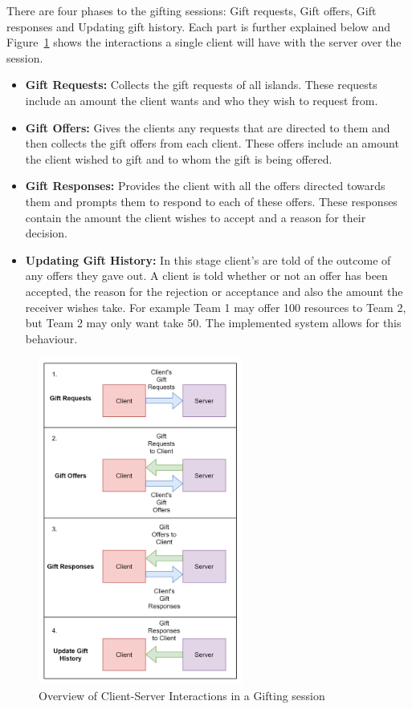 There are four phases to the gifting sessions: Gift requests, Gift offers, Gift responses and Updating gift history. Each part is further explained below and Figure~\ref{fig:IITO:gifting_session_diagram} shows the interactions a single client will have with the server over the session.
\begin{itemize}
    \item \textbf{Gift Requests:} Collects the gift requests of all islands. These requests include an amount the client wants and who they wish to request from.
    \item \textbf{Gift Offers:} Gives the clients any requests that are directed to them and then collects the gift offers from each client. These offers include an amount the client wished to gift and to whom the gift is being offered.
    \item \textbf{Gift Responses:} Provides the client with all the offers directed towards them and prompts them to respond to each of these offers. These responses contain the amount the client wishes to accept and a reason for their decision.
    \item \textbf{Updating Gift History:} In this stage client's are told of the outcome of any offers they gave out. A client is told whether or not an offer has been accepted, the reason for the rejection or acceptance and also the amount the receiver wishes take. For example Team 1 may offer 100 resources to Team 2, but Team 2 may only want take 50. The implemented system allows for this behaviour.
\end{itemize}

\begin{figure}[!htb]
    \centering
    \includegraphics[width=0.6\textwidth]{06_iito/images/gifting_diagram.png}
    \caption{Overview of Client-Server Interactions in a Gifting session}
    \label{fig:IITO:gifting_session_diagram}
\end{figure}


